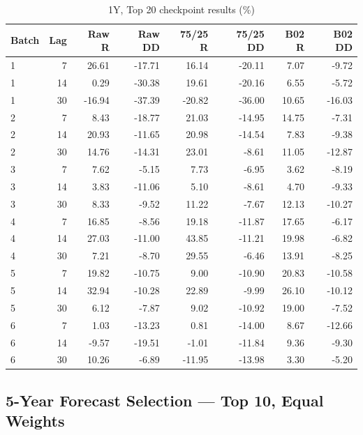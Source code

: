 \documentclass[11pt,a4paper]{article}
\numberwithin{table}{section}
\begin{document}
\begin{minipage}{\linewidth}
\begin{center}\footnotesize\setlength{\tabcolsep}{3pt}\renewcommand{\arraystretch}{1.12}
\begin{longtable}{@{}lrrrrrrr@{}}
\caption{1Y, Top 20 checkpoint results (\%)}\\
\toprule
Batch & Lag & Raw R & Raw DD & 75/25 R & 75/25 DD & B02 R & B02 DD\\\midrule\endhead
1 & 7 & 26.61 & -17.71 & 16.14 & -20.11 & 7.07 & -9.72\\
1 & 14 & 0.29 & -30.38 & 19.61 & -20.16 & 6.55 & -5.72\\
1 & 30 & -16.94 & -37.39 & -20.82 & -36.00 & 10.65 & -16.03\\
2 & 7 & 8.43 & -18.77 & 21.03 & -14.95 & 14.75 & -7.31\\
2 & 14 & 20.93 & -11.65 & 20.98 & -14.54 & 7.83 & -9.38\\
2 & 30 & 14.76 & -14.31 & 23.01 & -8.61 & 11.05 & -12.87\\
3 & 7 & 7.62 & -5.15 & 7.73 & -6.95 & 3.62 & -8.19\\
3 & 14 & 3.83 & -11.06 & 5.10 & -8.61 & 4.70 & -9.33\\
3 & 30 & 8.33 & -9.52 & 11.22 & -7.67 & 12.13 & -10.27\\
4 & 7 & 16.85 & -8.56 & 19.18 & -11.87 & 17.65 & -6.17\\
4 & 14 & 27.03 & -11.00 & 43.85 & -11.21 & 19.98 & -6.82\\
4 & 30 & 7.21 & -8.70 & 29.55 & -6.46 & 13.91 & -8.25\\
5 & 7 & 19.82 & -10.75 & 9.00 & -10.90 & 20.83 & -10.58\\
5 & 14 & 32.94 & -10.28 & 22.89 & -9.99 & 26.10 & -10.12\\
5 & 30 & 6.12 & -7.87 & 9.02 & -10.92 & 19.00 & -7.52\\
6 & 7 & 1.03 & -13.23 & 0.81 & -14.00 & 8.67 & -12.66\\
6 & 14 & -9.57 & -19.51 & -1.01 & -11.84 & 9.36 & -9.30\\
6 & 30 & 10.26 & -6.89 & -11.95 & -13.98 & 3.30 & -5.20\\
\bottomrule\end{longtable}\end{center}
\end{minipage}\par
{}
\subsection{5-Year Forecast Selection --- Top 10, Equal Weights}
\end{document}
